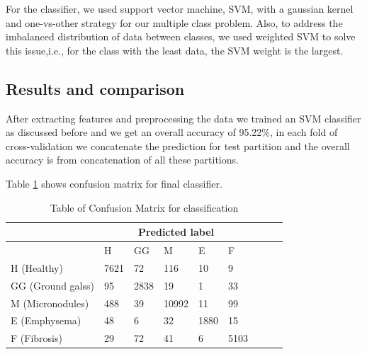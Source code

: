 \documentclass[conference]{IEEEtran}
\begin{document}
For the classifier, we used support vector machine, SVM, with a gaussian kernel and one-vs-other strategy for our multiple class problem. Also, to address the imbalanced distribution of data between classes, we used weighted SVM to solve this issue,i.e., for the class with the least data, the SVM weight is the largest.





\subsection{\textbf{Results and comparison}}

After extracting features and preprocessing the data we trained an SVM classifier as discussed before and we get an overall accuracy of 95.22\%, in each fold of cross-validation we concatenate the prediction for test partition and the overall accuracy is from concatenation of all these partitions.


Table  \ref{cm:CM} shows confusion matrix for final classifier.



\begin{table}[tbh]
\caption{Table of Confusion Matrix for classification}
\label{cm:CM}
\small
\centering
\begin{tabular}{@{}lllllllll@{}}
&& \multicolumn{3}{c}{Predicted label}\\
\toprule
 & H & GG & M & E & F \\ \midrule
 
H (Healthy) & 7621 & 72 & 116 & 10 & 9 \\ 
GG (Ground galss) & 95 & 2838 & 19 & 1 & 33 \\ 
M (Micronodules) & 488 & 39 & 10992 & 11 & 99 \\ 
E (Emphysema) & 48 & 6 & 32 & 1880 & 15 \\ 
F (Fibrosis) & 29 & 72 & 41 & 6 & 5103 \\ \bottomrule


\end{tabular}
\end{table}
\end{document}

